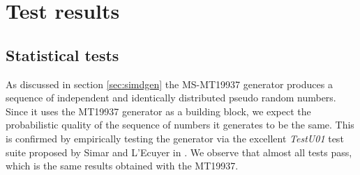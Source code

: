 \documentclass[preprint,1p,times]{elsarticle}
\begin{document}
\section{Test results}

\subsection{Statistical tests}
\noindent As discussed in section \ref{sec:simdgen} the MS-MT19937 generator produces a sequence of independent and identically distributed pseudo random numbers. Since it uses the MT19937 generator as a building block, we expect the probabilistic quality of the sequence of numbers it generates to be the same. This is confirmed by empirically testing the generator via the excellent \textit{TestU01} test suite proposed by Simar and L'Ecuyer in \cite{testu01}. We observe that almost all tests pass, which is the same results obtained with the MT19937.
\end{document}
